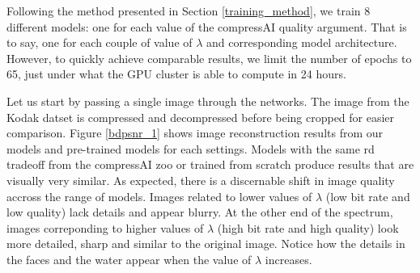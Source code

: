 Following the method presented in Section \ref{training_method}, we train 8 different models: one for each value of the compressAI \textsf{quality} argument. That is to say, one for each couple of value of \(\lambda\) and corresponding model architecture. However, to quickly achieve comparable results, we limit the number of epochs to 65, just under what the GPU cluster is able to compute in 24 hours.

Let us start by passing a single image through the networks. The image from the Kodak datset is compressed and decompressed before being cropped for easier comparison. Figure \ref{bdpsnr_1} shows image reconstruction results from our models and pre-trained models for each settings. Models with the same \acrshort{rd} tradeoff from the compressAI zoo or trained from scratch produce results that are visually very similar. As expected, there is a discernable shift in image quality accross the range of models. Images related to lower values of \(\lambda\) (low bit rate and low quality) lack details and appear blurry. At the other end of the spectrum, images correponding to higher values of \(\lambda\) (high bit rate and high quality) look more detailed, sharp and similar to the original image. Notice how the details in the faces and the water appear when the value of \(\lambda\) increases.

